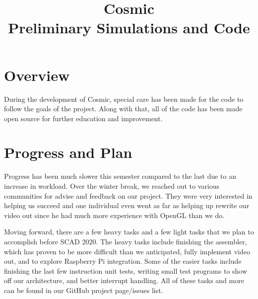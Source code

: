 \documentclass[conference]{IEEEtran}
\begin{document}
\title{
 Cosmic\\Preliminary Simulations and Code}

\author{
\and
{}

}

\maketitle

\section{Overview}
During the development of Cosmic, special care has been made for the code to follow the goals of the project. Along with that, all of the code has been made open source for further education and improvement.

\section{Progress and Plan}
Progress has been much slower this semester compared to the last due to an increase in workload. Over the winter break, we reached out to various communities for advise and feedback on our project. They were very interested in helping us succeed and one individual even went as far as helping up rewrite our video out since he had much more experience with OpenGL than we do.

Moving forward, there are a few heavy tasks and a few light tasks that we plan to accomplish before SCAD 2020. The heavy tasks include finishing the assembler, which has proven to be more difficult than we anticipated, fully implement video out, and to explore Raspberry Pi integration. Some of the easier tasks include finishing the last few instruction unit tests, writing small test programs to show off our architecture, and better interrupt handling. All of these tasks and more can be found in our GitHub project page/issues list.
\end{document}
